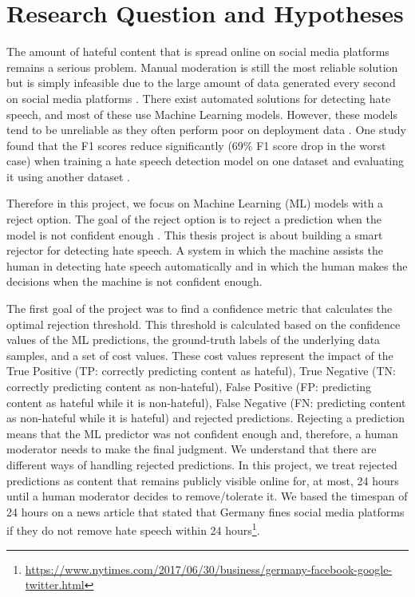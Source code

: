 \documentclass[a4paper]{article}
\begin{document}
\tableofcontents

\section{Research Question and Hypotheses}
The amount of hateful content that is spread online on social media platforms remains a serious problem. Manual moderation is still the most reliable solution but is simply infeasible due to the large amount of data generated every second on social media platforms \cite{balayn2021automatic}. There exist automated solutions for detecting hate speech, and most of these use Machine Learning models. However, these models tend to be unreliable as they often perform poor on deployment data \cite{balayn2021automatic, grondahl2018all}. One study found that the F1 scores reduce significantly (69\% F1 score drop in the worst case) when training a hate speech detection model on one dataset and evaluating it using another dataset \cite{grondahl2018all}.

Therefore in this project, we focus on Machine Learning (ML) models with a reject option. The goal of the reject option is to reject a prediction when the model is not confident enough \cite{hendrickx2021machine}. This thesis project is about building a smart rejector for detecting hate speech. A system in which the machine assists the human in detecting hate speech automatically and in which the human makes the decisions when the machine is not confident enough.

The first goal of the project was to find a confidence metric that calculates the optimal rejection threshold. This threshold is calculated based on the confidence values of the ML predictions, the ground-truth labels of the underlying data samples, and a set of cost values. These cost values represent the impact of the True Positive (TP: correctly predicting content as hateful), True Negative (TN: correctly predicting content as non-hateful), False Positive (FP: predicting content as hateful while it is non-hateful), False Negative (FN: predicting content as non-hateful while it is hateful) and rejected predictions. Rejecting a prediction means that the ML predictor was not confident enough and, therefore, a human moderator needs to make the final judgment. We understand that there are different ways of handling rejected predictions. In this project, we treat rejected predictions as content that remains publicly visible online for, at most, 24 hours until a human moderator decides to remove/tolerate it. We based the timespan of 24 hours on a news article that stated that Germany fines social media platforms if they do not remove hate speech within 24 hours\footnote{\url{https://www.nytimes.com/2017/06/30/business/germany-facebook-google-twitter.html}}.
\end{document}
